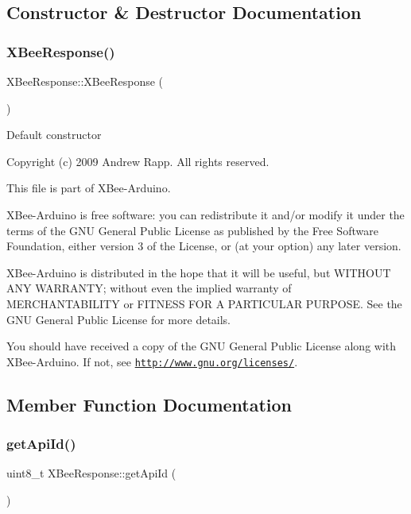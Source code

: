 \subsection{Constructor \& Destructor Documentation}
\hypertarget{class_x_bee_response_a03a6ea7651a40062c22ca0a37fbf512f}{}\label{class_x_bee_response_a03a6ea7651a40062c22ca0a37fbf512f} 
\subsubsection{\texorpdfstring{X\+Bee\+Response()}{XBeeResponse()}}
{\footnotesize\ttfamily X\+Bee\+Response\+::\+X\+Bee\+Response (\begin{DoxyParamCaption}{ }\end{DoxyParamCaption})}

Default constructor

Copyright (c) 2009 Andrew Rapp. All rights reserved.

This file is part of X\+Bee-\/\+Arduino.

X\+Bee-\/\+Arduino is free software\+: you can redistribute it and/or modify it under the terms of the G\+NU General Public License as published by the Free Software Foundation, either version 3 of the License, or (at your option) any later version.

X\+Bee-\/\+Arduino is distributed in the hope that it will be useful, but W\+I\+T\+H\+O\+UT A\+NY W\+A\+R\+R\+A\+N\+TY; without even the implied warranty of M\+E\+R\+C\+H\+A\+N\+T\+A\+B\+I\+L\+I\+TY or F\+I\+T\+N\+E\+SS F\+OR A P\+A\+R\+T\+I\+C\+U\+L\+AR P\+U\+R\+P\+O\+SE. See the G\+NU General Public License for more details.

You should have received a copy of the G\+NU General Public License along with X\+Bee-\/\+Arduino. If not, see \href{http://www.gnu.org/licenses/}{\tt http\+://www.\+gnu.\+org/licenses/}. 

\subsection{Member Function Documentation}
\hypertarget{class_x_bee_response_a4a9677e3b39054119fa278d1ad52130a}{}\label{class_x_bee_response_a4a9677e3b39054119fa278d1ad52130a} 
\subsubsection{\texorpdfstring{get\+Api\+Id()}{getApiId()}}
{\footnotesize\ttfamily uint8\+\_\+t X\+Bee\+Response\+::get\+Api\+Id (\begin{DoxyParamCaption}{ }\end{DoxyParamCaption})}

